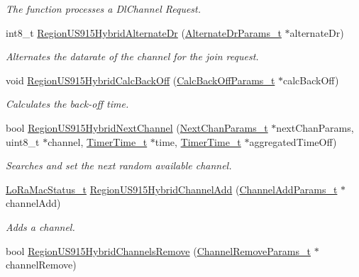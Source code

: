 \begin{DoxyCompactItemize}
\begin{DoxyCompactList}\small\item\em The function processes a Dl\+Channel Request. \end{DoxyCompactList}\item 
int8\+\_\+t \hyperlink{group__REGIONUS915HYB_ga1fc59564fb2891bf3883eb044c26b8c9}{Region\+U\+S915\+Hybrid\+Alternate\+Dr} (\hyperlink{group__REGION_ga001ea4338d1c83f4c785b49d7ad2d696}{Alternate\+Dr\+Params\+\_\+t} $\ast$alternate\+Dr)
\begin{DoxyCompactList}\small\item\em Alternates the datarate of the channel for the join request. \end{DoxyCompactList}\item 
void \hyperlink{group__REGIONUS915HYB_ga410890efd066c15fb3452cf8ae8362e9}{Region\+U\+S915\+Hybrid\+Calc\+Back\+Off} (\hyperlink{group__REGION_ga7c5c9a8da174e6679eded8257dc92fd9}{Calc\+Back\+Off\+Params\+\_\+t} $\ast$calc\+Back\+Off)
\begin{DoxyCompactList}\small\item\em Calculates the back-\/off time. \end{DoxyCompactList}\item 
bool \hyperlink{group__REGIONUS915HYB_gacf65a13088f128542dfe4d45b28297ce}{Region\+U\+S915\+Hybrid\+Next\+Channel} (\hyperlink{group__REGION_ga115f5e83afae352c0a3dcdc193374040}{Next\+Chan\+Params\+\_\+t} $\ast$next\+Chan\+Params, uint8\+\_\+t $\ast$channel, \hyperlink{utilities_8h_a4215ca43d3e953099ea758ce428599d0}{Timer\+Time\+\_\+t} $\ast$time, \hyperlink{utilities_8h_a4215ca43d3e953099ea758ce428599d0}{Timer\+Time\+\_\+t} $\ast$aggregated\+Time\+Off)
\begin{DoxyCompactList}\small\item\em Searches and set the next random available channel. \end{DoxyCompactList}\item 
\hyperlink{group__LORAMAC_ga30bd25657e10480f8605ee951b0ecfbd}{Lo\+Ra\+Mac\+Status\+\_\+t} \hyperlink{group__REGIONUS915HYB_ga82fc4da7c52d7b26a8fcd8704c8af9ab}{Region\+U\+S915\+Hybrid\+Channel\+Add} (\hyperlink{group__REGION_gab1c5f3aa06614283202906cef4417860}{Channel\+Add\+Params\+\_\+t} $\ast$channel\+Add)
\begin{DoxyCompactList}\small\item\em Adds a channel. \end{DoxyCompactList}\item 
bool \hyperlink{group__REGIONUS915HYB_ga01abfdc17109559ec3375226baf72331}{Region\+U\+S915\+Hybrid\+Channels\+Remove} (\hyperlink{group__REGION_gaa37468560d2fc81a977b57a48e5d72c0}{Channel\+Remove\+Params\+\_\+t} $\ast$channel\+Remove)

\end{DoxyCompactItemize}

